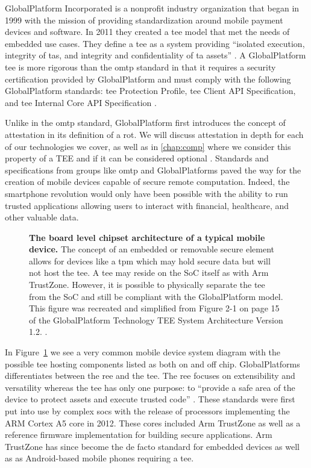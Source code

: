 GlobalPlatform Incorporated is a nonprofit industry organization that began in 1999 with the mission of providing standardization around mobile payment devices and software. In 2011 they created a \gls{tee} model \cite{GlobalPlatform2018} that met the needs of embedded use cases. They define a \gls{tee} as a system providing ``isolated execution, integrity of \glspl{ta}, and integrity and confidentiality of \gls{ta} assets'' \cite{GlobalPlatform2018}. A GlobalPlatform \gls{tee} is more rigorous than the \gls{omtp} standard in that it requires a security certification provided by GlobalPlatform and must comply with the following GlobalPlatform standards: \gls{tee} Protection Profile, \gls{tee} Client API Specification, and \gls{tee} Internal Core API Specification \cite{GPD2, GPD3, GPD4}.

Unlike in the \gls{omtp} standard, GlobalPlatform first introduces the concept of \gls{attestation} in its definition of a \gls{rot}. We will discuss \gls{attestation} in depth for each of our technologies we cover, as well as in \autoref{chap:comp} where we consider this property of a TEE and if it can be considered optional \cite{cccTAC}. Standards and specifications from groups like \gls{omtp} and GlobalPlatforms paved the way for the creation of mobile devices capable of secure remote computation. Indeed, the smartphone revolution would only have been possible with the ability to run trusted applications allowing users to interact with financial, healthcare, and other valuable data.

\begin{figure}[htbp]
\centering

\caption[GlobalPlatforms Typical Chipset Architecture]{\textbf{The board level chipset architecture of a typical mobile device.} The concept of an embedded or removable secure element allows for devices like a \gls{tpm} which may hold secure data but will not host the \gls{tee}. A \gls{tee} may reside on the SoC itself as with Arm TrustZone. However, it is possible to physically separate the \gls{tee} from the SoC and still be compliant with the GlobalPlatform model. This figure was recreated and simplified from Figure 2-1 on page 15 of the GlobalPlatform Technology TEE System Architecture Version 1.2. \cite{GlobalPlatform2018}.}
\label{fig:gpd-tee}
\end{figure}

In Figure~\ref{fig:gpd-tee} we see a very common mobile device system diagram with the possible \gls{tee} hosting components listed as both on and off chip. GlobalPlatforms differentiates between the \gls{ree} and the \gls{tee}. The \gls{ree} focuses on extensibility and versatility whereas the \gls{tee} has only one purpose: to ``provide a safe area of the device to protect assets and execute trusted code'' \cite{GlobalPlatform2018}.  These standards were first put into use by complex \glspl{soc} with the release of processors implementing the ARM Cortex A5 core in 2012. These cores included Arm TrustZone as well as a reference firmware implementation for building secure applications. Arm TrustZone has since become the de facto standard for embedded devices as well as as Android-based mobile phones requiring a \gls{tee}. 

